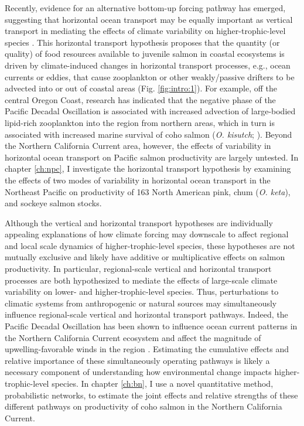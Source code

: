 Recently, evidence for an alternative bottom-up forcing pathway has emerged,
suggesting that horizontal ocean transport may be equally important as vertical
transport in mediating the effects of climate variability on
higher-trophic-level species \citep{DiLorenzo2013b}. This horizontal transport
hypothesis proposes that the quantity (or quality) of food resources available
to juvenile salmon in coastal ecosystems is driven by climate-induced changes in
horizontal transport processes, e.g., ocean currents or eddies, that cause
zooplankton or other weakly/passive drifters to be advected into or out of
coastal areas (Fig. \ref{fig:intro:1}). For example, off the central Oregon
Coast, research has indicated that the negative phase of the Pacific Decadal
Oscillation is associated with increased advection of large-bodied lipid-rich
zooplankton into the region from northern areas, which in turn is associated
with increased marine survival of coho salmon (\emph{O. kisutch};
\citealp{Keister2011a, Bi2011a}). Beyond the Northern California Current area,
however, the effects of variability in horizontal ocean transport on Pacific
salmon productivity are largely untested. In chapter \ref{ch:npc}, I investigate
the horizontal transport hypothesis by examining the effects of two modes of
variability in horizontal ocean transport in the Northeast Pacific on
productivity of 163 North American pink, chum (\emph{O. keta}), and sockeye
salmon stocks.

Although the vertical and horizontal transport hypotheses are individually
appealing explanations of how climate forcing may downscale to affect regional
and local scale dynamics of higher-trophic-level species, these hypotheses are
not mutually exclusive and likely have additive or multiplicative effects on
salmon productivity. In particular, regional-scale vertical and horizontal
transport processes are both hypothesized to mediate the effects of large-scale
climate variability on lower- and higher-trophic-level species. Thus,
perturbations to climatic systems from anthropogenic or natural sources may
simultaneously influence regional-scale vertical and horizontal transport
pathways. Indeed, the Pacific Decadal Oscillation has been shown to influence
ocean current patterns in the Northern California Current ecosystem and affect
the magnitude of upwelling-favorable winds in the region \citep{Keister2011a,
Chhak2007}. Estimating the cumulative effects and relative importance of these
simultaneously operating pathways is likely a necessary component of
understanding how environmental change impacts higher-trophic-level species. In
chapter \ref{ch:bn}, I use a novel quantitative method, probabilistic networks,
to estimate the joint effects and relative strengths of these different pathways
on productivity of coho salmon in the Northern California Current.


